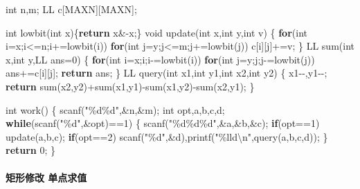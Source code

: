 \documentclass[
]{article}
\newenvironment{Shaded}{}{}
\newcommand{\ControlFlowTok}[1]{\textcolor[rgb]{0.00,0.44,0.13}{\textbf{#1}}}
\newcommand{\DataTypeTok}[1]{\textcolor[rgb]{0.56,0.13,0.00}{#1}}
\newcommand{\DecValTok}[1]{\textcolor[rgb]{0.25,0.63,0.44}{#1}}
\newcommand{\NormalTok}[1]{#1}
\newcommand{\SpecialCharTok}[1]{\textcolor[rgb]{0.25,0.44,0.63}{#1}}
\newcommand{\StringTok}[1]{\textcolor[rgb]{0.25,0.44,0.63}{#1}}
\begin{document}
\begin{Shaded}
\begin{Highlighting}[]
\DataTypeTok{int}\NormalTok{ n,m;}
\NormalTok{LL c[MAXN][MAXN];}

\DataTypeTok{int}\NormalTok{ lowbit(}\DataTypeTok{int}\NormalTok{ x)\{}\ControlFlowTok{return}\NormalTok{ x\&{-}x;\}}
\DataTypeTok{void}\NormalTok{ update(}\DataTypeTok{int}\NormalTok{ x,}\DataTypeTok{int}\NormalTok{ y,}\DataTypeTok{int}\NormalTok{ v)}
\NormalTok{\{}
    \ControlFlowTok{for}\NormalTok{(}\DataTypeTok{int}\NormalTok{ i=x;i\textless{}=n;i+=lowbit(i))}
        \ControlFlowTok{for}\NormalTok{(}\DataTypeTok{int}\NormalTok{ j=y;j\textless{}=m;j+=lowbit(j))}
\NormalTok{            c[i][j]+=v;}
\NormalTok{\}}
\NormalTok{LL sum(}\DataTypeTok{int}\NormalTok{ x,}\DataTypeTok{int}\NormalTok{ y,LL ans=}\DecValTok{0}\NormalTok{)}
\NormalTok{\{}
    \ControlFlowTok{for}\NormalTok{(}\DataTypeTok{int}\NormalTok{ i=x;i;i{-}=lowbit(i))}
        \ControlFlowTok{for}\NormalTok{(}\DataTypeTok{int}\NormalTok{ j=y;j;j{-}=lowbit(j))}
\NormalTok{            ans+=c[i][j];}
    \ControlFlowTok{return}\NormalTok{ ans;}
\NormalTok{\}}
\NormalTok{LL query(}\DataTypeTok{int}\NormalTok{ x1,}\DataTypeTok{int}\NormalTok{ y1,}\DataTypeTok{int}\NormalTok{ x2,}\DataTypeTok{int}\NormalTok{ y2)}
\NormalTok{\{}
\NormalTok{    x1{-}{-},y1{-}{-};}
    \ControlFlowTok{return}\NormalTok{ sum(x2,y2)+sum(x1,y1){-}sum(x1,y2){-}sum(x2,y1);}
\NormalTok{\}}

\DataTypeTok{int}\NormalTok{ work()}
\NormalTok{\{}
\NormalTok{    scanf(}\StringTok{"}\SpecialCharTok{\%d\%d}\StringTok{"}\NormalTok{,\&n,\&m);}
    \DataTypeTok{int}\NormalTok{ opt,a,b,c,d;}
    \ControlFlowTok{while}\NormalTok{(scanf(}\StringTok{"}\SpecialCharTok{\%d}\StringTok{"}\NormalTok{,\&opt)==}\DecValTok{1}\NormalTok{)}
\NormalTok{    \{}
\NormalTok{        scanf(}\StringTok{"}\SpecialCharTok{\%d\%d\%d}\StringTok{"}\NormalTok{,\&a,\&b,\&c);}
        \ControlFlowTok{if}\NormalTok{(opt==}\DecValTok{1}\NormalTok{) update(a,b,c);}
        \ControlFlowTok{if}\NormalTok{(opt==}\DecValTok{2}\NormalTok{) scanf(}\StringTok{"}\SpecialCharTok{\%d}\StringTok{"}\NormalTok{,\&d),printf(}\StringTok{"}\SpecialCharTok{\%lld\textbackslash{}n}\StringTok{"}\NormalTok{,query(a,b,c,d));}
\NormalTok{    \}}
    \ControlFlowTok{return} \DecValTok{0}\NormalTok{;}
\NormalTok{\}}
\end{Highlighting}
\end{Shaded}

\hypertarget{ux77e9ux5f62ux4feeux6539-ux5355ux70b9ux6c42ux503c}{%
\paragraph{矩形修改
单点求值}\label{ux77e9ux5f62ux4feeux6539-ux5355ux70b9ux6c42ux503c}}
\end{document}
